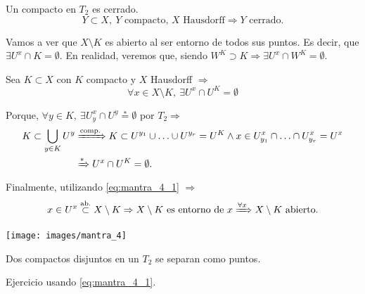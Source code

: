 \begin{prop}[Mantra 4]
Un compacto en $T_2$ es cerrado. 
\[
Y \subset X,\ Y \text{ compacto, } X \text{ Hausdorff} \Rightarrow Y \text{ cerrado.}
\]
\end{prop}
\begin{demo}
Vamos a ver que $X \setminus K$ es abierto al ser entorno de todos sus puntos. Es decir, que $\exists U^x \cap K = \emptyset$. 
En realidad, veremos que, siendo $W^K \supset K \Rightarrow \exists U^x \cap W^K = \emptyset$.

Sea $K \subset X$ con $K$ compacto y $X$ Hausdorff $\Rightarrow$
\begin{equation} \label{eq:mantra_4_1}
    \forall x \in X \setminus K,\ \exists U^x \cap U^K = \emptyset
\end{equation}

Porque, $\forall y \in K,\ \exists U_y^x \cap U^y \stackrel{*}{=} \emptyset$ por $T_2 \Rightarrow$
\begin{align*}
    K \subset \bigcup_{y \in K} U^y &\xRightarrow{\text{comp.}} K \subset U^{y_1} \cup \ldots \cup U^{y_r} = U^K \land x \in U_{y_1}^x \cap \ldots \cap U_{y_r}^x = U^x\\
    &\xRightarrow{*} U^x \cap U^K = \emptyset
.\end{align*}
Finalmente, utilizando \ref{eq:mantra_4_1} $\Rightarrow$
\[
    x \in U^x \stackrel{\text{ab.}}{\subset} X \setminus K \Rightarrow X\setminus K \text{ es entorno de } x \xRightarrow{\forall x} X \setminus K \text{ abierto.} 
\]
\begin{center}
    \texttt{[image: images/mantra\_4]} 
\end{center}
\end{demo}
\begin{coro}
Dos compactos disjuntos en un $T_2$ se separan como puntos.
\end{coro}
\begin{demo}
    Ejercicio usando \ref{eq:mantra_4_1}.
\end{demo}

